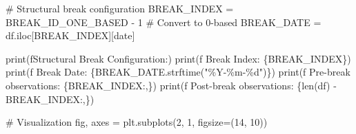 \documentclass[
  letterpaper,
  DIV=11,
  numbers=noendperiod]{scrartcl}
\newenvironment{Shaded}{\begin{snugshade}}{\end{snugshade}}
\newcommand{\BuiltInTok}[1]{\textcolor[rgb]{0.00,0.23,0.31}{#1}}
\newcommand{\CommentTok}[1]{\textcolor[rgb]{0.37,0.37,0.37}{#1}}
\newcommand{\DecValTok}[1]{\textcolor[rgb]{0.68,0.00,0.00}{#1}}
\newcommand{\NormalTok}[1]{\textcolor[rgb]{0.00,0.23,0.31}{#1}}
\newcommand{\OperatorTok}[1]{\textcolor[rgb]{0.37,0.37,0.37}{#1}}
\newcommand{\SpecialCharTok}[1]{\textcolor[rgb]{0.37,0.37,0.37}{#1}}
\newcommand{\SpecialStringTok}[1]{\textcolor[rgb]{0.13,0.47,0.30}{#1}}
\newcommand{\StringTok}[1]{\textcolor[rgb]{0.13,0.47,0.30}{#1}}
\begin{document}
\begin{Shaded}
\begin{Highlighting}[]
\CommentTok{\# Structural break configuration}
\NormalTok{BREAK\_INDEX }\OperatorTok{=}\NormalTok{ BREAK\_ID\_ONE\_BASED }\OperatorTok{{-}} \DecValTok{1}  \CommentTok{\# Convert to 0{-}based}
\NormalTok{BREAK\_DATE }\OperatorTok{=}\NormalTok{ df.iloc[BREAK\_INDEX][}\StringTok{\textquotesingle{}date\textquotesingle{}}\NormalTok{]}

\BuiltInTok{print}\NormalTok{(}\SpecialStringTok{f\textquotesingle{}Structural Break Configuration:\textquotesingle{}}\NormalTok{)}
\BuiltInTok{print}\NormalTok{(}\SpecialStringTok{f\textquotesingle{}  Break Index: }\SpecialCharTok{\{}\NormalTok{BREAK\_INDEX}\SpecialCharTok{\}}\SpecialStringTok{\textquotesingle{}}\NormalTok{)}
\BuiltInTok{print}\NormalTok{(}\SpecialStringTok{f\textquotesingle{}  Break Date: }\SpecialCharTok{\{}\NormalTok{BREAK\_DATE}\SpecialCharTok{.}\NormalTok{strftime(}\StringTok{"\%Y{-}\%m{-}}\SpecialCharTok{\%d}\StringTok{"}\NormalTok{)}\SpecialCharTok{\}}\SpecialStringTok{\textquotesingle{}}\NormalTok{)}
\BuiltInTok{print}\NormalTok{(}\SpecialStringTok{f\textquotesingle{}  Pre{-}break observations: }\SpecialCharTok{\{}\NormalTok{BREAK\_INDEX}\SpecialCharTok{:,\}}\SpecialStringTok{\textquotesingle{}}\NormalTok{)}
\BuiltInTok{print}\NormalTok{(}\SpecialStringTok{f\textquotesingle{}  Post{-}break observations: }\SpecialCharTok{\{}\BuiltInTok{len}\NormalTok{(df) }\OperatorTok{{-}}\NormalTok{ BREAK\_INDEX}\SpecialCharTok{:,\}}\SpecialStringTok{\textquotesingle{}}\NormalTok{)}

\CommentTok{\# Visualization}
\NormalTok{fig, axes }\OperatorTok{=}\NormalTok{ plt.subplots(}\DecValTok{2}\NormalTok{, }\DecValTok{1}\NormalTok{, figsize}\OperatorTok{=}\NormalTok{(}\DecValTok{14}\NormalTok{, }\DecValTok{10}\NormalTok{))}


\end{Highlighting}
\end{Shaded}
\end{document}
